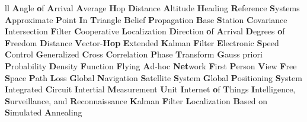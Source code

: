 \documentclass[
	12pt, %
	english, %
	onehalfspacing, %
	liststotoc, %
	toctotoc, %
	parskip, %
	headsepline, %
]{MastersDoctoralThesis} %
\begin{document}
\begin{abbreviations}{ll} %
			{\textbf{A}ngle \textbf{o}f \textbf{A}rrival}
			{\textbf{A}verage \textbf{H}op \textbf{D}istance} 
			{\textbf{A}ltitude \textbf{H}eading \textbf{R}eference \textbf{S}ystems}
			{\textbf{A}pproximate \textbf{P}oint \textbf{I}n \textbf{T}riangle}
				{\textbf{B}elief \textbf{P}ropagation} 
				{\textbf{B}ase \textbf{S}tation}
			{\textbf{C}ovariance \textbf{I}ntersection \textbf{F}ilter}   
				{\textbf{C}ooperative \textbf{L}ocalization}
			{\textbf{D}irection \textbf{o}f \textbf{A}rrival}
			{\textbf{D}egrees \textbf{o}f \textbf{F}reedom}
			{\textbf{D}istance \textbf{V}ector-\textbf{Hop}}
			{\textbf{E}xtended \textbf{K}alman \textbf{F}ilter}
			{\textbf{E}lectronic \textbf{S}peed \textbf{C}ontrol}
		{\textbf{G}eneralized \textbf{C}ross \textbf{C}orrelation \textbf{P}hase \textbf{T}ransform}
			{\textbf{G}auss priori \textbf{P}robability \textbf{D}ensity \textbf{F}unction}
			{\textbf{F}lying \textbf{A}d-hoc \textbf{Net}work}
			{\textbf{F}irst \textbf{P}erson \textbf{V}iew}
			{\textbf{F}ree \textbf{S}pace \textbf{P}ath \textbf{L}oss}
			{\textbf{G}lobal \textbf{N}avigation \textbf{S}atellite \textbf{S}ystem}
			{\textbf{G}lobal \textbf{P}ositioning \textbf{S}ystem}
				{\textbf{I}ntegrated  \textbf{C}ircuit}
			{\textbf{I}ntertial \textbf{M}easurement \textbf{U}nit}
			{\textbf{I}nternet \textbf{o}f \textbf{T}hings}
			{\textbf{I}ntelligence, \textbf{S}urveillance, and \textbf{R}econnaissance}
				{\textbf{K}alman \textbf{F}ilter}
			{\textbf{L}ocalization \textbf{B}ased on \textbf{S}imulated \textbf{A}nnealing}

\end{abbreviations}
\end{document}
